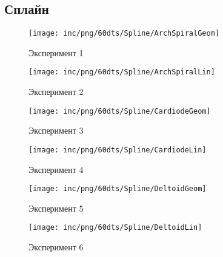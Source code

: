 \subsection{Сплайн}
\begin{figure}  
	\begin{minipage}{0,5\textwidth}
		\texttt{[image: inc/png/60dts/Spline/ArchSpiralGeom]}
		\label{fig:app1}
		\caption{Эксперимент 1}
	\end{minipage}
	\begin{minipage}{0,5\textwidth}
		\texttt{[image: inc/png/60dts/Spline/ArchSpiralLin]}
		\label{fig:app2}
		\caption{Эксперимент 2}
	\end{minipage}
	
	\begin{minipage}{0,5\textwidth}
		\texttt{[image: inc/png/60dts/Spline/CardiodeGeom]}
		\label{fig:app3}
		\caption{Эксперимент 3}
	\end{minipage}
	\begin{minipage}{0,5\textwidth}
		\texttt{[image: inc/png/60dts/Spline/CardiodeLin]}
		\label{fig:app4}
		\caption{Эксперимент 4}
	\end{minipage}
	
	\begin{minipage}{0,5\textwidth}
		\texttt{[image: inc/png/60dts/Spline/DeltoidGeom]}
		\label{fig:app1}
		\caption{Эксперимент 5}
	\end{minipage}
	\begin{minipage}{0,5\textwidth}
		\texttt{[image: inc/png/60dts/Spline/DeltoidLin]}
		\label{fig:app2}
		\caption{Эксперимент 6}
	\end{minipage}
\end{figure}


